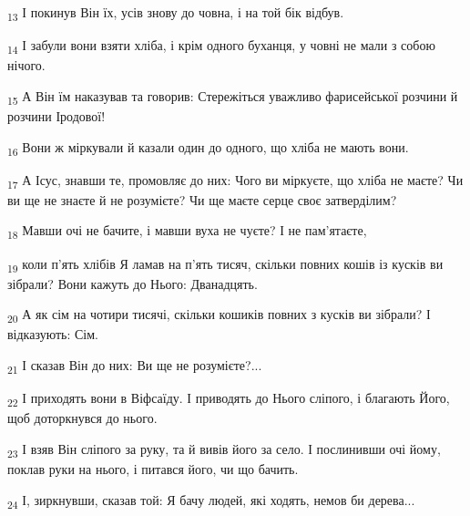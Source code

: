 \begin{tcolorbox}
\textsubscript{13} І покинув Він їх, усів знову до човна, і на той бік відбув.
\end{tcolorbox}
\begin{tcolorbox}
\textsubscript{14} І забули вони взяти хліба, і крім одного буханця, у човні не мали з собою нічого.
\end{tcolorbox}
\begin{tcolorbox}
\textsubscript{15} А Він їм наказував та говорив: Стережіться уважливо фарисейської розчини й розчини Іродової!
\end{tcolorbox}
\begin{tcolorbox}
\textsubscript{16} Вони ж міркували й казали один до одного, що хліба не мають вони.
\end{tcolorbox}
\begin{tcolorbox}
\textsubscript{17} А Ісус, знавши те, промовляє до них: Чого ви міркуєте, що хліба не маєте? Чи ви ще не знаєте й не розумієте? Чи ще маєте серце своє затверділим?
\end{tcolorbox}
\begin{tcolorbox}
\textsubscript{18} Мавши очі не бачите, і мавши вуха не чуєте? І не пам'ятаєте,
\end{tcolorbox}
\begin{tcolorbox}
\textsubscript{19} коли п'ять хлібів Я ламав на п'ять тисяч, скільки повних кошів із кусків ви зібрали? Вони кажуть до Нього: Дванадцять.
\end{tcolorbox}
\begin{tcolorbox}
\textsubscript{20} А як сім на чотири тисячі, скільки кошиків повних з кусків ви зібрали? І відказують: Сім.
\end{tcolorbox}
\begin{tcolorbox}
\textsubscript{21} І сказав Він до них: Ви ще не розумієте?...
\end{tcolorbox}
\begin{tcolorbox}
\textsubscript{22} І приходять вони в Віфсаїду. І приводять до Нього сліпого, і благають Його, щоб доторкнувся до нього.
\end{tcolorbox}
\begin{tcolorbox}
\textsubscript{23} І взяв Він сліпого за руку, та й вивів його за село. І послинивши очі йому, поклав руки на нього, і питався його, чи що бачить.
\end{tcolorbox}
\begin{tcolorbox}
\textsubscript{24} І, зиркнувши, сказав той: Я бачу людей, які ходять, немов би дерева...
\end{tcolorbox}
